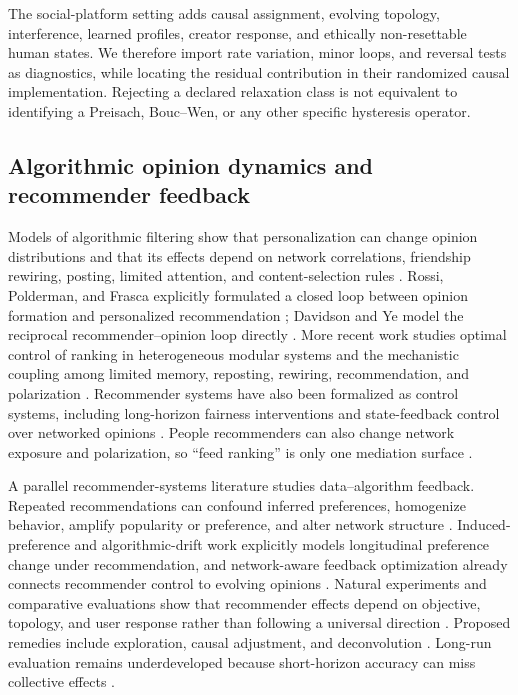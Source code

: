 \documentclass[pdflatex,sn-mathphys-num]{sn-jnl}
\begin{document}
The social-platform setting adds causal assignment, evolving topology, interference, learned profiles, creator response, and ethically non-resettable human states. We therefore import rate variation, minor loops, and reversal tests as diagnostics, while locating the residual contribution in their randomized causal implementation. Rejecting a declared relaxation class is not equivalent to identifying a Preisach, Bouc--Wen, or any other specific hysteresis operator.

\subsection{Algorithmic opinion dynamics and recommender feedback}

Models of algorithmic filtering show that personalization can change opinion distributions and that its effects depend on network correlations, friendship rewiring, posting, limited attention, and content-selection rules \cite{perra2019personalisation,sirbu2019bias,arruda2022algorithms,peralta2020asymmetry,valensise2023drivers,donkers2024desounding}. Rossi, Polderman, and Frasca explicitly formulated a closed loop between opinion formation and personalized recommendation \cite{rossi2018closedloop}; Davidson and Ye model the reciprocal recommender--opinion loop directly \cite{davidson2026closedloop}. More recent work studies optimal control of ranking in heterogeneous modular systems and the mechanistic coupling among limited memory, reposting, rewiring, recommendation, and polarization \cite{gezha2026control,oliveira2026interplay}. Recommender systems have also been formalized as control systems, including long-horizon fairness interventions and state-feedback control over networked opinions \cite{depasquale2026control,mariano2026optimal,mariano2026pathological}. People recommenders can also change network exposure and polarization, so ``feed ranking'' is only one mediation surface \cite{cinus2022people}.

A parallel recommender-systems literature studies data--algorithm feedback. Repeated recommendations can confound inferred preferences, homogenize behavior, amplify popularity or preference, and alter network structure \cite{chaney2018confounding,mansoury2020feedback,kalimeris2021amplification,zhao2013longterm,su2016network}. Induced-preference and algorithmic-drift work explicitly models longitudinal preference change under recommendation, and network-aware feedback optimization already connects recommender control to evolving opinions \cite{coppolillo2025drift,chandrasekaran2026networkaware}. Natural experiments and comparative evaluations show that recommender effects depend on objective, topology, and user response rather than following a universal direction \cite{moller2018diversity,fabbri2022minorities,frey2010connections}. Proposed remedies include exploration, causal adjustment, and deconvolution \cite{jadidinejad2020exploration,krauth2025causal,sinha2016deconvolving}. Long-run evaluation remains underdeveloped because short-horizon accuracy can miss collective effects \cite{jannach2020mcnamara,ge2020ecommerce,zoralioglu2026dynamic}.
\end{document}
